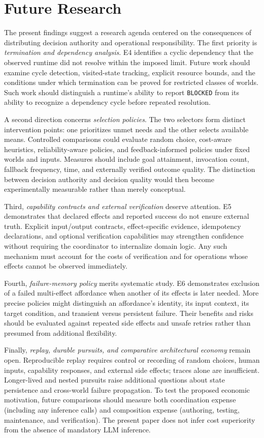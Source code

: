 \documentclass[11pt]{article}
\begin{document}
\section{Future Research}
The present findings suggest a research agenda centered on the consequences of distributing decision authority and operational responsibility. The first priority is \emph{termination and dependency analysis}. E4 identifies a cyclic dependency that the observed runtime did not resolve within the imposed limit. Future work should examine cycle detection, visited-state tracking, explicit resource bounds, and the conditions under which termination can be proved for restricted classes of worlds. Such work should distinguish a runtime's ability to report \texttt{BLOCKED} from its ability to recognize a dependency cycle before repeated resolution.

A second direction concerns \emph{selection policies}. The two selectors form distinct intervention points: one prioritizes unmet needs and the other selects available means. Controlled comparisons could evaluate random choice, cost-aware heuristics, reliability-aware policies, and feedback-informed policies under fixed worlds and inputs. Measures should include goal attainment, invocation count, fallback frequency, time, and externally verified outcome quality. The distinction between decision authority and decision quality would then become experimentally measurable rather than merely conceptual.

Third, \emph{capability contracts and external verification} deserve attention. E5 demonstrates that declared effects and reported success do not ensure external truth. Explicit input/output contracts, effect-specific evidence, idempotency declarations, and optional verification capabilities may strengthen confidence without requiring the coordinator to internalize domain logic. Any such mechanism must account for the costs of verification and for operations whose effects cannot be observed immediately.

Fourth, \emph{failure-memory policy} merits systematic study. E6 demonstrates exclusion of a failed multi-effect affordance when another of its effects is later needed. More precise policies might distinguish an affordance's identity, its input context, its target condition, and transient versus persistent failure. Their benefits and risks should be evaluated against repeated side effects and unsafe retries rather than presumed from additional flexibility.

Finally, \emph{replay, durable pursuits, and comparative architectural economy} remain open. Reproducible replay requires control or recording of random choices, human inputs, capability responses, and external side effects; traces alone are insufficient. Longer-lived and nested pursuits raise additional questions about state persistence and cross-world failure propagation. To test the proposed economic motivation, future comparisons should measure both coordination expense (including any inference calls) and composition expense (authoring, testing, maintenance, and verification). The present paper does not infer cost superiority from the absence of mandatory LLM inference.
\end{document}
